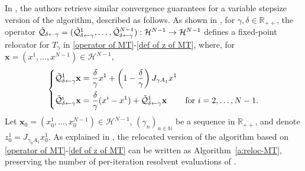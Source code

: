 \documentclass[a4paper,12pt]{article}
\begin{document}
In \cite[Section 5]{atenas2025relocated}, the authors retrieve similar convergence guarantees for a variable stepsize version of the algorithm, described as follows. As shown in \cite[Proposition 5.5]{atenas2025relocated}, for $\gamma, \delta \in \mathbb{R}_{++}$, the operator $\mathcal{\Tilde{Q}}_{\delta\leftarrow\gamma}=(\mathcal{\Tilde{Q}}^1_{\delta\leftarrow\gamma},\dots,\mathcal{\Tilde{Q}}^{N-1}_{\delta\leftarrow\gamma}):\mathcal{H}^{N-1}\rightarrow\mathcal{H}^{N-1}$ defines a fixed-point relocator for $T_\gamma$ in \eqref{operator of MT}-\eqref{def of z of MT}, where, for $\mathbf{x} = (x^1, \dots, x^{N-1}) \in \mathcal{H}^{N-1}$,
\begin{equation}\label{relocator of MT}
    \left\{\begin{aligned}
        \mathcal{\Tilde{Q}}^1_{\delta\leftarrow\gamma}\mathbf{x}&=\frac{\delta}{\gamma}x^1+\left(1-\frac{\delta}{\gamma}\right)J_{\gamma A_1}x^1 &&\\
        \mathcal{\Tilde{Q}}^i_{\delta\leftarrow\gamma} \mathbf{x}&=\frac{\delta}{\gamma}(x^i-x^1)+\mathcal{\Tilde{Q}}^1_{\delta\leftarrow\gamma}\mathbf{x} &&\text{for~}i=2,\dots,N-1.
    \end{aligned}\right.
\end{equation}
Let $\mathbf{x}_0=(x_0^1,\dots,x_0^{N-1})\in\mathcal{H}^{N-1}$, $(\gamma_n)_{n\in\mathbb{N}}$ be a sequence in $\mathbb{R}_{++}$, and denote $z_0^1=J_{\gamma_0A_1}x_0^1$. As explained in \cite[Proposition~5.7]{atenas2025relocated}, the relocated version of the algorithm based on \eqref{operator of MT}-\eqref{def of z of MT} can be written as Algorithm~\ref{a:reloc-MT}, preserving the number of per-iteration resolvent evaluations of \cite[Algorithm 1]{malitsky2023resolvent}.
\end{document}
